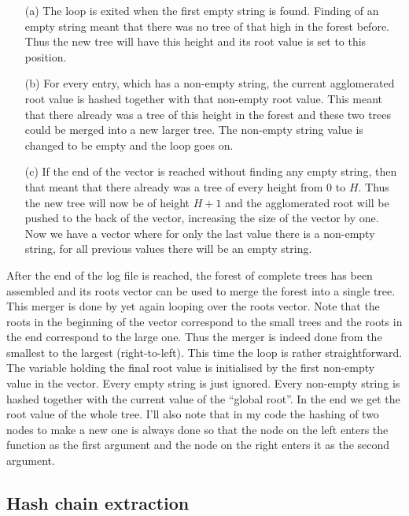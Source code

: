 \documentclass[11pt]{article}
\begin{document}
\begin{itemize}
 	\item[(a)] The loop is exited when the first empty string is found. Finding of an empty string meant that there was no tree of that high in the forest before. Thus the new tree will have this height and its root value is set to this position.   
 	\item[(b)] For every entry, which has a non-empty string, the current agglomerated root value is hashed together with that non-empty root value. This meant that there already was a tree of this height in the forest and these two trees could be merged into a new larger tree. The non-empty string value is changed to be empty and the loop goes on.
 	\item[(c)] If the end of the vector is reached without finding any empty string, then that meant that there already was a tree of every height from $0$ to $H$. Thus the new tree will now be of height $H+1$ and the agglomerated root will be pushed to the back of the vector, increasing the size of the vector by one. Now we have a vector where for only the last value there is a non-empty string, for all previous values there will be an empty string. 
\end{itemize} 

After the end of the log file is reached, the forest of complete trees has been assembled and its roots vector can be used to merge the forest into a single tree. This merger is done by yet again looping over the roots vector. Note that the roots in the beginning of the vector correspond to the small trees and the roots in the end correspond to the large one. Thus the merger is indeed done from the smallest to the largest (right-to-left). This time the loop is rather straightforward. The variable holding the final root value is initialised by the first non-empty value in the vector. Every empty string is just ignored. Every non-empty string is hashed together with the current value of the ``global root''. In the end we get the root value of the whole tree. I'll also note that in my code the hashing of two nodes to make a new one is always done so that the node on the left enters the function as the first argument and the node on the right enters it as the second argument. 



\subsection{Hash chain extraction} %
\label{sub:hash_chain_extraction}
\end{document}
